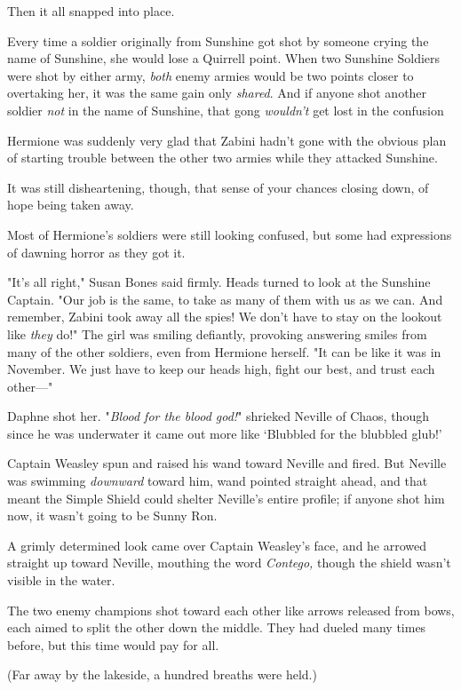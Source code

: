 Then it all snapped into place.

Every time a soldier originally from Sunshine got shot by someone crying the
name of Sunshine, she would lose a Quirrell point. When two Sunshine Soldiers
were shot by either army, \emph{both} enemy armies would be two points closer
to overtaking her, it was the same gain only \emph{shared}. And if anyone shot
another soldier \emph{not} in the name of Sunshine, that gong \emph{wouldn't}
get lost in the confusion{\el}

Hermione was suddenly very glad that Zabini hadn't gone with the obvious plan
of starting trouble between the other two armies while they attacked Sunshine.

It was still disheartening, though, that sense of your chances closing down, of
hope being taken away.

Most of Hermione's soldiers were still looking confused, but some had
expressions of dawning horror as they got it.

"It's all right," Susan Bones said firmly. Heads turned to look at the Sunshine
Captain. "Our job is the same, to take as many of them with us as we can. And
remember, Zabini took away all the spies! We don't have to stay on the lookout
like \emph{they} do!" The girl was smiling defiantly, provoking answering
smiles from many of the other soldiers, even from Hermione herself. "It can be
like it was in November. We just have to keep our heads high, fight our best,
and trust each other---"

Daphne shot her.
\sbreak
"\emph{Blood for the blood god!}" shrieked Neville of Chaos, though since he
was underwater it came out more like `Blubbled for the blubbled glub!'

Captain Weasley spun and raised his wand toward Neville and fired. But Neville
was swimming \emph{downward} toward him, wand pointed straight ahead, and that
meant the Simple Shield could shelter Neville's entire profile; if anyone shot
him now, it wasn't going to be Sunny Ron.

A grimly determined look came over Captain Weasley's face, and he arrowed
straight up toward Neville, mouthing the word \emph{Contego,} though the shield
wasn't visible in the water.

The two enemy champions shot toward each other like arrows released from bows,
each aimed to split the other down the middle. They had dueled many times
before, but this time would pay for all.

(Far away by the lakeside, a hundred breaths were held.)

